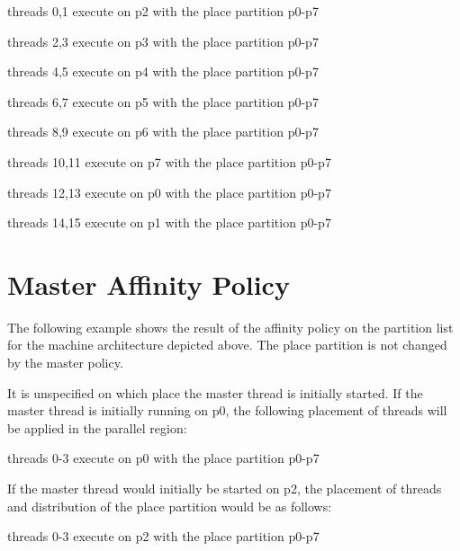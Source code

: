 \begin{compactitem}
\item threads 0,1 execute on p2 with the place partition p0-p7

\item threads 2,3 execute on p3 with the place partition p0-p7

\item threads 4,5 execute on p4 with the place partition p0-p7

\item threads 6,7 execute on p5 with the place partition p0-p7

\item threads 8,9 execute on p6 with the place partition p0-p7

\item threads 10,11 execute on p7 with the place partition p0-p7

\item threads 12,13 execute on p0 with the place partition p0-p7

\item threads 14,15 execute on p1 with the place partition p0-p7
\end{compactitem}

\section{Master Affinity Policy}

The following example shows the result of the  affinity policy on 
the partition list for the machine architecture depicted above. The place partition 
is not changed by the master policy.



It is unspecified on which place the master thread is initially started. If the 
master thread is initially running on p0, the following placement of threads will 
be applied in the parallel region:

\begin{compactitem}
\item threads 0-3 execute on p0 with the place partition p0-p7
\end{compactitem}

If the master thread would initially be started on p2, the placement of threads 
and distribution of the place partition would be as follows:

\begin{compactitem}
\item threads 0-3 execute on p2 with the place partition p0-p7
\end{compactitem}


